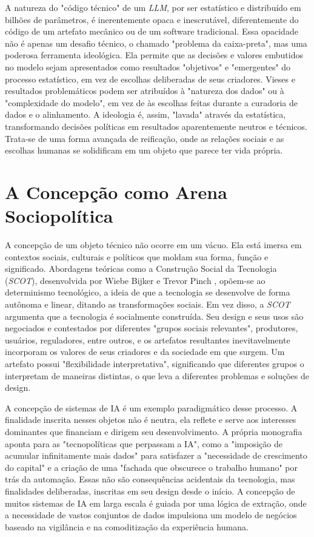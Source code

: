 A natureza do "código técnico" de um \textit{LLM}, por ser estatístico e distribuído em bilhões de parâmetros, é inerentemente opaca e inescrutável, diferentemente do código de um 
artefato mecânico ou de um software tradicional. 
Essa opacidade não é apenas um desafio técnico, o chamado "problema da caixa-preta", mas uma poderosa ferramenta ideológica. 
Ela permite que as decisões e valores embutidos no modelo sejam apresentados como resultados "objetivos" e "emergentes" do processo estatístico, em vez de escolhas deliberadas 
de seus criadores. 
Vieses e resultados problemáticos podem ser atribuídos à "natureza dos dados" ou à "complexidade do modelo", em vez de às escolhas feitas durante a curadoria 
de dados e o alinhamento. 
A ideologia é, assim, "lavada" através da estatística, transformando decisões políticas em resultados aparentemente neutros e técnicos. 
Trata-se de 
uma forma avançada de reificação, onde as relações sociais e as escolhas humanas se solidificam em um objeto que parece ter vida própria. 

\section{A Concepção como Arena Sociopolítica}\label{sec:concepcao_arena_sociopolitica}

A concepção de um objeto técnico não ocorre em um vácuo. 
Ela está imersa em contextos sociais, culturais e políticos que moldam sua forma, função e significado. 
Abordagens 
teóricas como a Construção Social da Tecnologia (\textit{SCOT}), desenvolvida por Wiebe Bijker e Trevor Pinch \cite{BijkerPinch1989}, opõem-se ao determinismo tecnológico, a ideia de que a tecnologia se 
desenvolve de forma autônoma e linear, ditando as transformações sociais. 
Em vez disso, a \textit{SCOT} argumenta que a tecnologia é socialmente construída. 
Seu design e seus usos são 
negociados e contestados por diferentes "grupos sociais relevantes", produtores, usuários, reguladores, entre outros, e os artefatos resultantes inevitavelmente incorporam os valores 
de seus criadores e da sociedade em que surgem. 
Um artefato possui "flexibilidade interpretativa", significando que diferentes grupos o interpretam de maneiras distintas, o que 
leva a diferentes problemas e soluções de design. 

A concepção de sistemas de IA é um exemplo paradigmático desse processo. A finalidade inscrita nesses objetos não é neutra,
ela reflete e serve aos interesses dominantes que 
financiam e dirigem seu desenvolvimento. 
A própria monografia aponta para as "tecnopolíticas que perpassam a IA", como a "imposição de acumular infinitamente mais dados" para 
satisfazer a "necessidade de crescimento do capital" e a criação de uma "fachada que obscurece o trabalho humano" por trás da automação. 
Essas não são consequências acidentais 
da tecnologia, mas finalidades deliberadas, inscritas em seu design desde o início. 
A concepção de muitos sistemas de IA em larga escala é guiada por uma lógica de extração, 
onde a necessidade de vastos conjuntos de dados impulsiona um modelo de negócios baseado na vigilância e na comoditização da experiência humana. 

